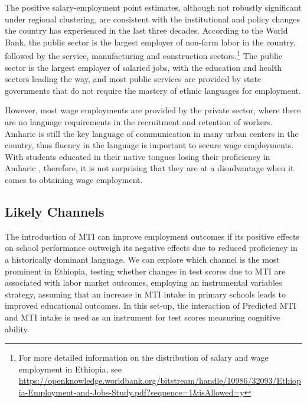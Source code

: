 The positive salary-employment point estimates, although not robustly significant under regional clustering, are consistent with the institutional and policy changes the country has experienced in the last three decades. According to the World Bank, the public sector is the largest employer of non-farm labor in the country, followed by the service, manufacturing and construction sectors.\footnote{For more detailed information on the distribution of salary and wage employment in Ethiopia, see \url{https://openknowledge.worldbank.org/bitstream/handle/10986/32093/Ethiopia-Employment-and-Jobs-Study.pdf?sequence=1&isAllowed=y}} The public sector is the largest employer of salaried jobs, with the education and health sectors leading the way, and most public services are provided by state governments that do not require the mastery of ethnic languages for employment.


However, most wage employments are provided by the private sector, where there are no language requirements in the recruitment and retention of workers. Amharic is still the key language of communication in many urban centers in the country, thus fluency in the language is important to secure wage employments. With students educated in their native tongues losing their proficiency in Amharic \citep{taye_medium_2019}, therefore, it is not surprising that they are at a disadvantage when it comes to obtaining wage employment.  

\subsection*{Likely Channels}

The introduction of MTI can improve employment outcomes if its positive effects on school performance outweigh its negative effects due to reduced proficiency in a historically dominant language. We can explore which channel is the most prominent in Ethiopia, testing whether changes in test scores due to MTI are associated with labor market outcomes, employing an instrumental variables strategy, assuming that an increase in MTI intake in primary schools leads to improved educational outcomes. In this set-up, the interaction of Predicted MTI and MTI intake is used as an instrument for test scores measuring cognitive ability. 

